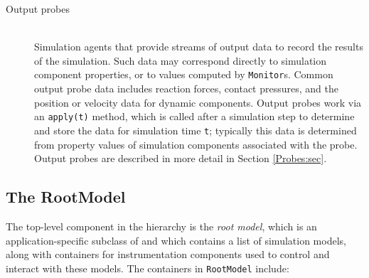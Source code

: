 \begin{description}
\item[Output probes] \mbox{}\hfill\\
Simulation agents that provide streams of output data to record the results of
the simulation. Such data may correspond directly to simulation component
properties, or to values computed by {\tt Monitor}s.  Common output probe data
includes reaction forces, contact pressures, and the position or velocity data
for dynamic components. Output probes work via an {\tt apply(t)} method, which
is called after a simulation step to determine and store the data for
simulation time {\tt t}; typically this data is determined from property values
of simulation components associated with the probe. Output probes are described
in more detail in Section \ref{Probes:sec}.

\end{description}

%

\subsection{The RootModel}
\label{RootModel:sec}

The top-level component in the hierarchy is the {\it root model}, which is an
application-specific subclass
of  and which contains a list of
simulation models, along with containers for instrumentation components used to
control and interact with these models. The containers in {\tt RootModel}
include:

